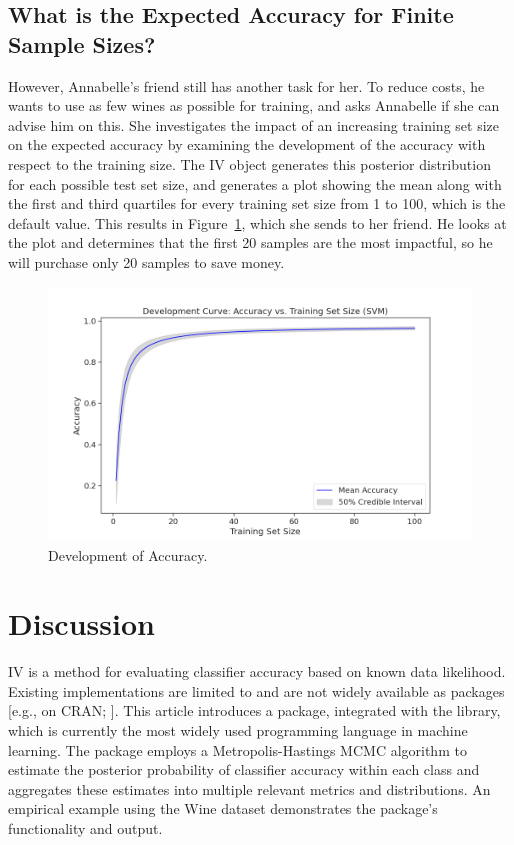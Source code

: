 \documentclass[article]{jss}
\begin{document}
\subsection{What is the Expected Accuracy for Finite Sample Sizes?} \label{sec:ex_finite_samples}

However, Annabelle’s friend still has another task for her.
To reduce costs, he wants to use as few wines as possible for training, and asks Annabelle if she can advise him on this.
She investigates the impact of an increasing training set size on the expected accuracy by examining the development of the accuracy with respect to the training size.
The IV object generates this posterior distribution for each possible test set size, and generates a plot showing the mean along with the first and third quartiles for every training set size from 1 to 100, which is the default value.
This results in Figure~\ref{fig:development}, which she sends to her friend.
He looks at the plot and determines that the first 20 samples are the most impactful, so he will purchase only 20 samples to save money.

\begin{figure}[t!]
\centering
\includegraphics{plots/figure4.png}
\caption{Development of Accuracy. \label{fig:development}}
\end{figure}

\section{Discussion} \label{sec:discussion}
IV is a method for evaluating classifier accuracy based on known data likelihood. Existing implementations are limited to  and are not widely available as packages [e.g., on CRAN; \citep{braun_independent_2023}]. This article introduces a  package, integrated with the  library, which is currently the most widely used programming language in machine learning. The package employs a Metropolis-Hastings MCMC algorithm to estimate the posterior probability of classifier accuracy within each class and aggregates these estimates into multiple relevant metrics and distributions. An empirical example using the Wine dataset \citep{aeberhard1994comparative} demonstrates the package’s functionality and output.
\end{document}
